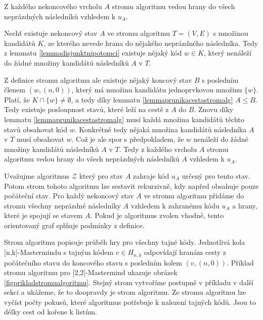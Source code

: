 \begin{tvrz}\label{tvrzvsichninaslednici}
    Z každého nekoncového vrcholu $A$ stromu algoritmu vedou hrany do všech neprázdných následníků vzhledem k $u_A$.
\end{tvrz}
\begin{dukaz}
    Nechť existuje nekoncový stav $A$ ve stromu algoritmu $T = (V,E)$ s množinou kandidátů $K$, ze kterého nevede hrana do nějakého neprázdného následníka. Tedy z lemmatu \ref{lemmadisjunktnipotomci} existuje nějaký kód $w \in K$, který nenáleží do žádné množiny kandidátů následníků $A$ v $T$. 

    Z definice stromu algoritmu ale existuje nějaký koncový stav $B$ s posledním členem $(w,(n,0))$, který má množinu kandidátu jednoprvkovou množinu $\{w\}$. Platí, že $K\cap \{w\} \neq \emptyset$, a tedy díky lemmatu \ref{lemmaprunikacestastromalg} $A \leq B$. Tedy existuje posloupnost stavů, které leží na cestě z $A$ do $B$. Znovu díky lemmatu \ref{lemmaprunikacestastromalg} musí každá množina kandidátů těchto stavů obsahovat kód $w$. Konkrétně tedy nějaká množina kandidátů následníka $A$ v $T$ musí obsahovat $w$. Což je ale spor s předpokladem, že $w$ nenáleží do žádné množiny kandidátů následníků $A$ v $T$. Tedy z každého vrcholu $A$ stromu algoritmu vedou hrany do všech neprázdných následníků $A$ vzhledem k $u_A$. 
\end{dukaz}


\begin{pozn}
    Uvažujme algoritmus $\mathcal{Z}$ který pro stav $A$ zahraje kód $u_A$ určený pro tento stav. Potom strom tohoto algoritmu lze sestavit rekurzivně, kdy napřed obsahuje pouze počáteční stav. Pro každý nekoncový stav $A$ ve stromu algoritmu přidáme do stromu všechny neprázdné následníky $A$ vzhledem k zahranému kódu $u_A$ a hrany, které je spojují se stavem $A$. 
    Pokud je algoritmus zvolen vhodně, tento orientovaný graf splňuje podmínky z definice. 
\end{pozn}
 Strom algoritmu popisuje průběh hry pro všechny tajné kódy. Jednotlivá kola [n,k]-Mastermindu s tajným kódem $v\in H_{n,k}$ odpovídají hranám cesty z počátečního stavu do koncového stavu s posledním kolem $(v,(n,0))$. Příklad stromu algoritmu pro [2,2]-Mastermind ukazuje obrázek \ref{figprikladstromualgoritmu}. Stejný strom vytvoříme postupně v příkladu v další sekci a ukážeme, že to doopravdy je strom algoritmu. Ze stromu algoritmu lze vyčíst počty pokusů, které algoritmus potřebuje k nalezení tajných kódů. Jsou to délky cest od kořene k listům.

